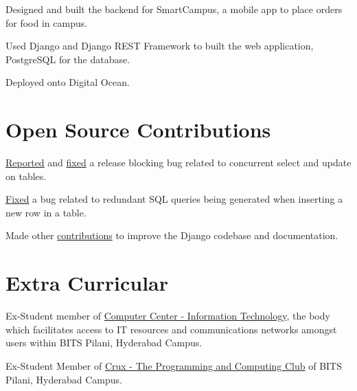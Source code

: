 \documentclass[]{abhijeet_viswa-deedy-resume-openfont}
\begin{document}
\begin{minipage}[t]{0.70\textwidth}
\begin{tightemize}
 \item Designed and built the backend for SmartCampus, a mobile app to place orders for food in campus.
 \item Used Django and Django REST Framework to built the web application, PostgreSQL for the database.
 \item Deployed onto Digital Ocean.
\end{tightemize}
\primarysectionsep  %

\section{Open Source Contributions}
\begin{tightemize}
\item \href{https://code.djangoproject.com/ticket/31246}{Reported} and \href{https://github.com/django/django/pull/12434}{fixed}
a release blocking bug related to concurrent select and update on tables.
\item \justifying\href{https://github.com/django/django/pull/12496}{Fixed} a bug related to redundant SQL queries being generated when
inserting a new row in a table.
\item \justifying Made other \href{https://github.com/django/django/pulls?q=author\%3Aabhijeetviswa}{contributions} to improve the Django codebase and
documentation.
\end{tightemize}
\primarysectionsep

\subsectionsep %
\section{Extra Curricular}
\vspace{\itemsep}
\begin{tightemize}
\item Ex-Student member of \href{https://universe.bits-pilani.ac.in/Hyderabad/Computercentre}{Computer Center - Information Technology},
the body which facilitates access to IT resources and communications networks amongst users within BITS Pilani, Hyderabad Campus.
\item Ex-Student Member of \href{https://crux-bphc.github.io}{Crux - The Programming and Computing Club} of BITS Pilani, Hyderabad Campus.
\end{tightemize}
\end{minipage}
\end{document}
